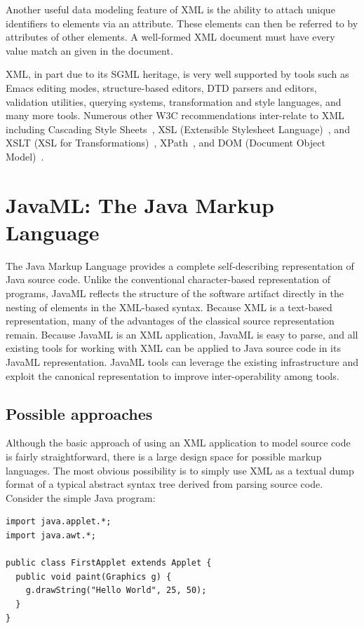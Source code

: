 \documentclass{article}
\begin{document}
Another useful data modeling feature of XML is the ability to attach
unique identifiers to elements via an  attribute.  These
elements can then be referred to by  attributes
of other elements.  A well-formed XML document must have every
 value match an  given in the document.

XML, in part due to its SGML heritage, is very well supported by tools
such as Emacs editing modes, structure-based editors, DTD parsers and
editors, validation utilities, querying systems, transformation and
style languages, and many more tools.  Numerous other W3C recommendations
inter-relate to XML including Cascading Style Sheets~\cite{CSS2},
XSL (Extensible Stylesheet Language)~\cite{XSL},
and XSLT (XSL for Transformations)~\cite{XSLT},
XPath~\cite{XPath}, and DOM (Document Object Model)~\cite{DOM}.

\section{JavaML: The Java Markup Language}
\label{sec-javaml}

The Java Markup Language provides a complete self-describing
representation of Java source code.  Unlike the conventional
character-based representation of programs, JavaML reflects the
structure of the software artifact directly in the nesting of elements
in the XML-based syntax.  Because XML is a text-based representation, many
of the advantages of the classical source representation remain. Because
JavaML is an XML application, JavaML is easy to parse, and
all existing tools for working with XML can be applied to Java source
code in its JavaML representation.  JavaML tools can leverage the
existing infrastructure and exploit the canonical representation to
improve inter-operability among tools.

\subsection{Possible approaches}

Although the basic approach of using an XML application to model source
code is fairly straightforward, there is a large design space for
possible markup languages.  The most obvious possibility is to simply use
XML as a textual dump format of a typical abstract syntax tree derived
from parsing source code.  Consider the simple Java program:

\begin{verbatim}
import java.applet.*;
import java.awt.*;

public class FirstApplet extends Applet {
  public void paint(Graphics g) {
    g.drawString("Hello World", 25, 50);
  }
}
\end{verbatim}
\end{document}
